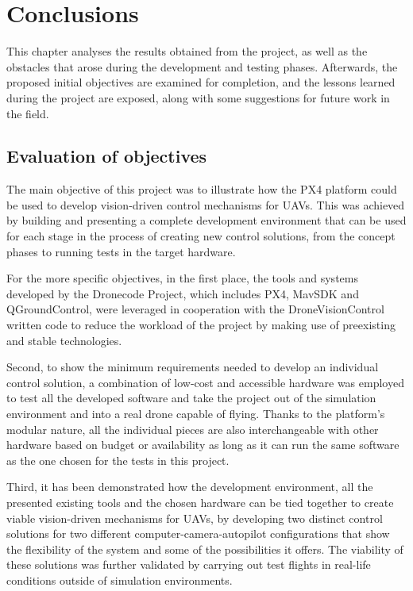 \chapter{Conclusions}
\label{chap:conclusion}

This chapter analyses the results obtained from the project, as well as the obstacles that arose during the development and testing phases.
Afterwards, the proposed initial objectives are examined for completion, and the lessons learned during the project are exposed, along with some suggestions for future work in the field.

\section{Evaluation of objectives}
\label{sec:consecucion-objetivos}

The main objective of this project was to illustrate how the PX4 platform could be used to develop vision-driven control mechanisms for UAVs.
This was achieved by building and presenting a complete development environment that can be used for each stage in the process of creating new control solutions, from the concept phases to running tests in the target hardware.

For the more specific objectives, in the first place,
the tools and systems developed by the Dronecode Project, which includes PX4, MavSDK and QGroundControl, were leveraged in cooperation with the DroneVisionControl written code to reduce the workload of the project by making use of preexisting and stable technologies.

Second, to show the minimum requirements needed to develop an individual control solution, a combination of low-cost and accessible hardware was employed to test all the developed software and take the project out of the simulation environment and into a real drone capable of flying.
Thanks to the platform's modular nature, all the individual pieces are also interchangeable with other hardware based on budget or availability as long as it can run the same software as the one chosen for the tests in this project.

Third, it has been demonstrated how the development environment, all the presented existing tools and the chosen hardware can be tied together to create viable vision-driven mechanisms for UAVs, 
by developing two distinct control solutions for two different computer-camera-autopilot configurations that show the flexibility of the system and some of the possibilities it offers.
The viability of these solutions was further validated by carrying out test flights in real-life conditions outside of simulation environments.

